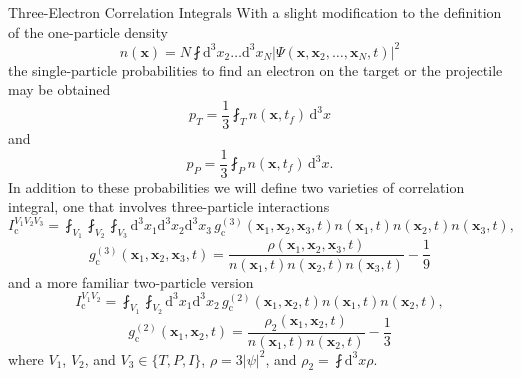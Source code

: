 \documentclass[a5paper, 9 pt]{extreport}
\begin{document}
\begin{appendices}
\begin{chapter}{Three-Electron Correlation Integrals \label{chap:moreIc}}
      With a slight modification to the definition of the one-particle density
      \begin{equation} \label{eq:xDen}
         n(\mathbf{x}) = N \fint \mathrm{d}^3 x_2 \dots \mathrm{d}^3 x_N
            \left| \Psi( \mathbf{x}, \mathbf{x}_2, \dots, \mathbf{x}_N, t) \right|^2
      \end{equation}
      the single-particle probabilities to find an electron on the target or the projectile may be
      obtained
      \begin{equation}
         p_T = \frac{1}{3} \fint_T n(\mathbf{x},t_f) \, \mathrm{d}^3 x
      \end{equation}
      and
      \begin{equation}
         p_P = \frac{1}{3} \fint_P n(\mathbf{x},t_f) \, \mathrm{d}^3 x.
      \end{equation}
      In addition to these probabilities we will define two varieties of correlation integral, one that
      involves three-particle interactions
      \begin{equation}
         I_\mathrm{c}^{V_1 V_2 V_3} = \fint_{V_1} \fint_{V_2} \fint_{V_3}
           \mathrm{d}^3 x_1 \mathrm{d}^3 x_2 \mathrm{d}^3 x_3 \,
           g^{(3)}_\mathrm{c}(\mathbf{x}_1, \mathbf{x}_2, \mathbf{x}_3, t)
           n(\mathbf{x}_1,t) n(\mathbf{x}_2,t) n(\mathbf{x}_3,t),
      \end{equation}
      \begin{equation}
         g^{(3)}_\mathrm{c}(\mathbf{x}_1, \mathbf{x}_2, \mathbf{x}_3, t) =
            \frac{\rho(\mathbf{x}_1, \mathbf{x}_2, \mathbf{x}_3, t)}
            {n(\mathbf{x}_1,t) n(\mathbf{x}_2,t) n(\mathbf{x}_3,t)} - \frac{1}{9}
      \end{equation}
      and a more familiar two-particle version
      \begin{equation}
         I_\mathrm{c}^{V_1 V_2} = \fint_{V_1} \fint_{V_2} \mathrm{d}^3 x_1 \mathrm{d}^3 x_2 \,
         g^{(2)}_\mathrm{c}(\mathbf{x}_1, \mathbf{x}_2, t) n(\mathbf{x}_1,t) n(\mathbf{x}_2,t),
      \end{equation}
      \begin{equation}
         g^{(2)}_\mathrm{c}(\mathbf{x}_1, \mathbf{x}_2, t) =
         \frac{\rho_2(\mathbf{x}_1, \mathbf{x}_2, t)}
         {n(\mathbf{x}_1,t) n(\mathbf{x}_2,t) } - \frac{1}{3}
      \end{equation}
      where $V_1$, $V_2$, and $V_3 \in \{T,P,I\}$, $\rho = 3|\psi|^2$, and $\rho_2 =
      \fint \mathrm{d}^3 x \rho$.


\end{chapter}
\end{appendices}
\end{document}
